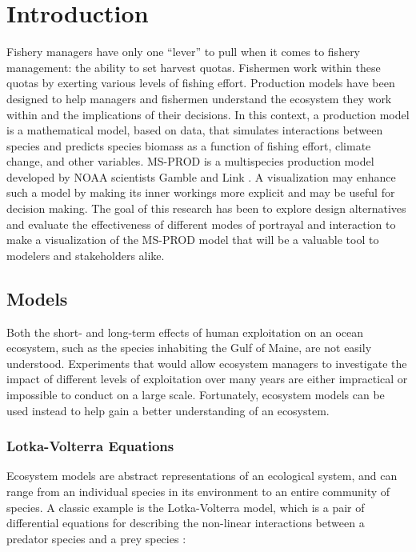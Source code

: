 \chapter{Introduction} 

\renewcommand{\thepart}{{\Roman{part}}}	

Fishery managers have only one ``lever'' to pull when it comes to fishery management: the ability to set harvest quotas.  Fishermen work within these quotas by exerting various levels of fishing effort.  Production models have been designed to help managers and fishermen understand the ecosystem they work within and the implications of their decisions.  In this context, a production model is a mathematical model, based on data, that simulates interactions between species and predicts species biomass as a function of fishing effort, climate change, and other variables.  MS-PROD is a multispecies production model developed by NOAA scientists Gamble and Link \citeyearpar{gamble2009}.  A visualization may enhance such a model by making its inner workings more explicit and may be useful for decision making. The goal of this research has been to explore design alternatives and evaluate the effectiveness of different modes of portrayal and interaction to make a visualization of the MS-PROD model that will be a valuable tool to modelers and stakeholders alike. 

\section{Models}

Both the short- and long-term effects of human exploitation on an ocean ecosystem, such as the species inhabiting the Gulf of Maine, are not easily understood.  Experiments that would allow ecosystem managers to investigate the impact of different levels of exploitation over many years are either impractical or impossible to conduct on a large scale.  Fortunately, ecosystem models can be used instead to help gain a better understanding of an ecosystem.

\subsection{Lotka-Volterra Equations}

Ecosystem models are abstract representations of an ecological system, and can range from an individual species in its environment to an entire community of species.  A classic example is the Lotka-Volterra model, which is a pair of differential equations for describing the non-linear interactions between a predator species and a prey species \cite{lotka1926, volterra1926}:

